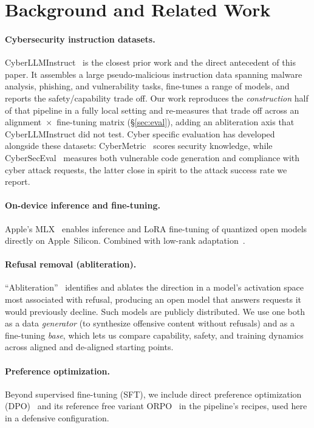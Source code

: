 \section{Background and Related Work}
\label{sec:background}

\paragraph{Cybersecurity instruction datasets.}
CyberLLMInstruct~\cite{cyberllminstruct} is the closest prior work and the
direct antecedent of this paper. It assembles a large pseudo-malicious
instruction data spanning malware analysis, phishing, and vulnerability
tasks, fine-tunes a range of models, and reports the safety/capability
trade off. Our work reproduces the \emph{construction} half of that pipeline in a
fully local setting and re-measures that trade off across an
alignment~$\times$~fine-tuning matrix (\S\ref{sec:eval}), adding an
abliteration axis that CyberLLMInstruct did not test.
Cyber specific evaluation has developed alongside these datasets: CyberMetric~\cite{cybermetric} scores security knowledge, while CyberSecEval~\cite{bhatt2023cyberseceval} measures both vulnerable code generation and compliance with cyber attack requests, the latter close in spirit to the attack success rate we report.

\paragraph{On-device inference and fine-tuning.}
Apple's MLX~\cite{mlx} enables inference and LoRA fine-tuning of quantized
open models directly on Apple~Silicon. Combined with low-rank
adaptation~\cite{lora}.

\paragraph{Refusal removal (abliteration).}
``Abliteration''~\cite{abliteration} identifies and ablates the direction in a
model's activation space most associated with refusal, producing an open model
that answers requests it would previously decline. Such models are publicly
distributed. We use one both as a data \emph{generator} (to synthesize
offensive content without refusals) and as a fine-tuning \emph{base}, which
lets us compare capability, safety, and training dynamics across aligned and
de-aligned starting points.

\paragraph{Preference optimization.}
Beyond supervised fine-tuning (SFT), we include direct preference
optimization (DPO)~\cite{dpo} and its reference free variant
ORPO~\cite{orpo} in the pipeline's recipes, used here in a defensive
configuration.

